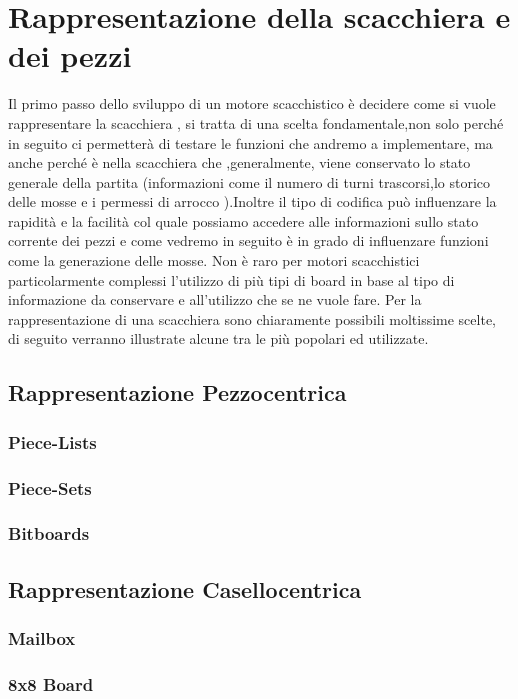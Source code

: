 \section{Rappresentazione della scacchiera e dei pezzi} %
Il primo passo dello sviluppo di un motore scacchistico è decidere come si vuole rappresentare 
la scacchiera , si tratta di una scelta fondamentale,non solo perché in seguito ci permetterà
di testare le funzioni che andremo a implementare, ma anche perché è nella scacchiera che ,generalmente,
viene conservato lo stato generale della partita (informazioni come il numero di turni trascorsi,lo 
storico delle mosse e i permessi di arrocco ).Inoltre il tipo di codifica può influenzare la rapidità
e la facilità col quale possiamo accedere alle informazioni sullo stato corrente dei pezzi 
e come vedremo in seguito è in grado di influenzare funzioni come la generazione delle mosse.
Non è raro per motori scacchistici particolarmente complessi l'utilizzo di più tipi di board in base
al tipo di informazione da conservare e all'utilizzo che se ne vuole fare.
Per la rappresentazione di una scacchiera sono chiaramente possibili moltissime scelte, di seguito
verranno illustrate alcune tra le più popolari ed utilizzate.

\subsection{Rappresentazione Pezzocentrica}
\subsubsection{Piece-Lists}
\subsubsection{Piece-Sets}
\subsubsection{Bitboards}


\subsection{Rappresentazione Casellocentrica}
\subsubsection{Mailbox}
\subsubsection{8x8 Board}
